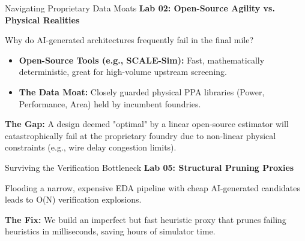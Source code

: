 \documentclass[aspectratio=169,10pt]{beamer}
\begin{document}
\begin{frame}{Navigating Proprietary Data Moats}
  \textbf{Lab 02: Open-Source Agility vs. Physical Realities}

  \vspace{0.3cm}
  Why do AI-generated architectures frequently fail in the final mile?

  \vspace{0.2cm}
  \begin{itemize}
    \item \textbf{Open-Source Tools (e.g., SCALE-Sim):} Fast, mathematically deterministic, great for high-volume upstream screening.
    \item \textbf{The Data Moat:} Closely guarded physical PPA libraries (Power, Performance, Area) held by incumbent foundries.
  \end{itemize}

  \vspace{0.2cm}
  \textbf{The Gap:} A design deemed "optimal" by a linear open-source estimator will catastrophically fail at the proprietary foundry due to non-linear physical constraints (e.g., wire delay congestion limits).
\end{frame}

\begin{frame}{Surviving the Verification Bottleneck}
  \textbf{Lab 05: Structural Pruning Proxies}

  \vspace{0.3cm}
  Flooding a narrow, expensive EDA pipeline with cheap AI-generated candidates leads to O(N) verification explosions.

  \vspace{0.4cm}
  \begin{center}
  \end{center}

  \vspace{0.4cm}
  \textbf{The Fix:} We build an imperfect but fast heuristic proxy that prunes failing heuristics in milliseconds, saving hours of simulator time.
\end{frame}
\end{document}
